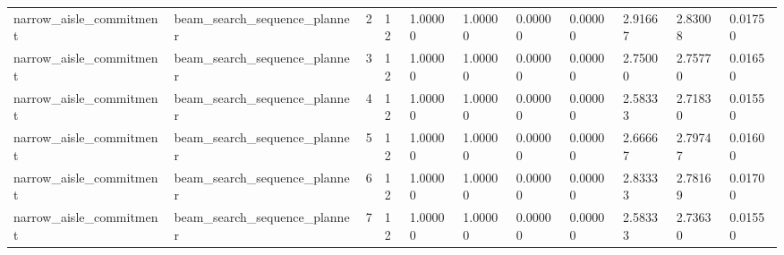 \documentclass{article}
\begin{document}
\begin{table}[tbp]
{\begin{tabular}{lllllllllll}
narrow\_aisle\_commitment & beam\_search\_sequence\_planner & 2 & 12 & 1.00000 & 1.00000 & 0.00000 & 0.00000 & 2.91667 & 2.83008 & 0.01750 \\
narrow\_aisle\_commitment & beam\_search\_sequence\_planner & 3 & 12 & 1.00000 & 1.00000 & 0.00000 & 0.00000 & 2.75000 & 2.75770 & 0.01650 \\
narrow\_aisle\_commitment & beam\_search\_sequence\_planner & 4 & 12 & 1.00000 & 1.00000 & 0.00000 & 0.00000 & 2.58333 & 2.71830 & 0.01550 \\
narrow\_aisle\_commitment & beam\_search\_sequence\_planner & 5 & 12 & 1.00000 & 1.00000 & 0.00000 & 0.00000 & 2.66667 & 2.79747 & 0.01600 \\
narrow\_aisle\_commitment & beam\_search\_sequence\_planner & 6 & 12 & 1.00000 & 1.00000 & 0.00000 & 0.00000 & 2.83333 & 2.78169 & 0.01700 \\
narrow\_aisle\_commitment & beam\_search\_sequence\_planner & 7 & 12 & 1.00000 & 1.00000 & 0.00000 & 0.00000 & 2.58333 & 2.73630 & 0.01550 \\
\bottomrule
\end{tabular}
}
\end{table}

\clearpage
\end{document}
